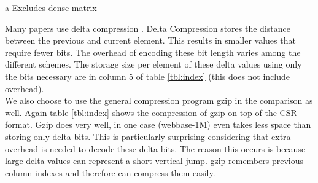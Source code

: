 \begin{table*}
\begin{threeparttable}
\begin{tabular}{ccccccccc}
\hline
\end{tabular}
\begin{tablenotes}
\item [a] Excludes dense matrix
\end{tablenotes}
\end{threeparttable}
\end{table*}

\par Many papers use delta compression \cite{smac:r3, smac:kourtis, smac:kestur}. Delta Compression stores the distance between the previous and current element. This results in smaller values that require fewer bits. The overhead of encoding these bit length varies among the different schemes. The storage size per element of these delta values using only the bits necessary are in column 5 of table \ref{tbl:index} (this does not include overhead).\\
\indent We also choose to use the general compression program gzip in the comparison as well. Again table \ref{tbl:index} shows the compression of gzip on top of the CSR format. Gzip does very well, in one case (webbase-1M) even takes less space than storing only delta bits. This is particularly surprising considering that extra overhead is needed to decode these delta bits. The reason this occurs is because large delta values can represent a short vertical jump. gzip remembers previous column indexes and therefore can compress them easily.\\%
